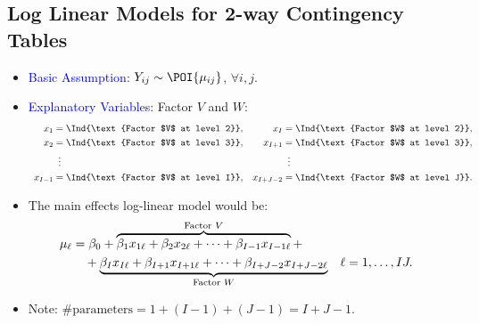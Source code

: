 \documentclass{article}\usepackage[]{graphicx}\usepackage[svgnames]{xcolor}
\let\log\relax%
\begin{document}
\subsection*{Log Linear Models for 2-way Contingency Tables}
\begin{itemize}
      \item \textcolor{Blue}{Basic Assumption}: $ Y_{ij} \sim \POI{\mu_{ij}} $, $ \forall i,j $.
      \item \textcolor{Blue}{Explanatory Variables}: Factor $V$ and $W$:
            \[ \begin{array}{cc}
                        \begin{aligned}
                              x_1     & =\Ind{\text{Factor $V$ at level 2}}, \\
                              x_2     & =\Ind{\text{Factor $V$ at level 3}}, \\
                                      & \vdotswithin{=}                      \\
                              x_{I-1} & =\Ind{\text{Factor $V$ at level I}}, \\
                        \end{aligned} &
                        \begin{aligned}
                              x_I       & =\Ind{\text{Factor $W$ at level 2}}, \\
                              x_{I+1}   & =\Ind{\text{Factor $W$ at level 3}}, \\
                                        & \vdotswithin{=}                      \\
                              x_{I+J-2} & =\Ind{\text{Factor $W$ at level J}}. \\
                        \end{aligned}
                  \end{array} \]
      \item The main effects log-linear model would be:
            \begin{align*}
                  \log{\mu_\ell}
                   & =\beta_0+\overbrace{\beta_1x_{1\ell}+\beta_2x_{2\ell}+\cdots+\beta_{I-1}x_{I-1\ell}}^{\text{Factor $V$}}+                               \\
                   & \quad+\underbrace{\beta_Ix_{I\ell}+\beta_{I+1}x_{I+1\ell}+\cdots+\beta_{I+J-2}x_{I+J-2\ell}}_{\text{Factor $W$}} &  & \ell=1,\ldots,IJ.
            \end{align*}
      \item Note: $ \text{\# parameters}=1+(I-1)+(J-1)=I+J-1 $.

\end{itemize}
\end{document}

